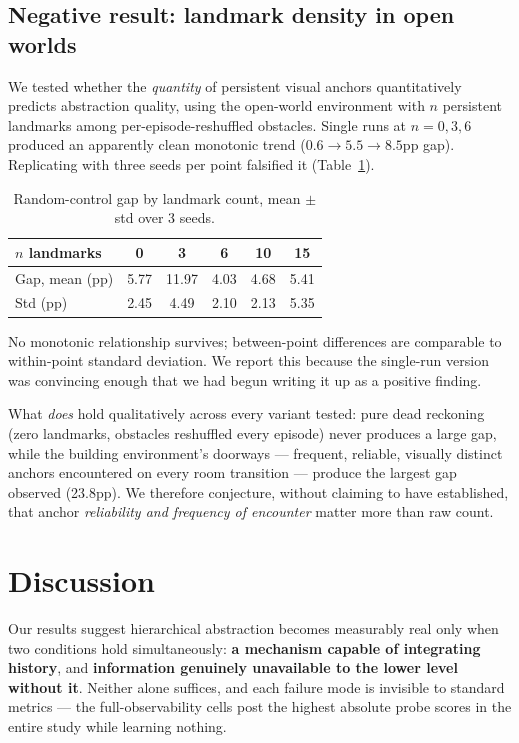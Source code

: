 \documentclass[11pt]{article}
\begin{document}
\subsection{Negative result: landmark density in open worlds}

We tested whether the \emph{quantity} of persistent visual anchors quantitatively predicts abstraction quality, using the open-world environment with $n$ persistent landmarks among per-episode-reshuffled obstacles. Single runs at $n=0,3,6$ produced an apparently clean monotonic trend ($0.6\to5.5\to8.5$pp gap). Replicating with three seeds per point falsified it (Table~\ref{tab:landmark}).

\begin{table}[h]
\centering
\caption{Random-control gap by landmark count, mean $\pm$ std over 3 seeds.}
\label{tab:landmark}
\begin{tabular}{lccccc}
\toprule
$n$ landmarks & 0 & 3 & 6 & 10 & 15 \\
\midrule
Gap, mean (pp) & 5.77 & 11.97 & 4.03 & 4.68 & 5.41 \\
Std (pp) & 2.45 & 4.49 & 2.10 & 2.13 & 5.35 \\
\bottomrule
\end{tabular}
\end{table}

No monotonic relationship survives; between-point differences are comparable to within-point standard deviation. We report this because the single-run version was convincing enough that we had begun writing it up as a positive finding.

What \emph{does} hold qualitatively across every variant tested: pure dead reckoning (zero landmarks, obstacles reshuffled every episode) never produces a large gap, while the building environment's doorways --- frequent, reliable, visually distinct anchors encountered on every room transition --- produce the largest gap observed (23.8pp). We therefore conjecture, without claiming to have established, that anchor \emph{reliability and frequency of encounter} matter more than raw count.

\section{Discussion}

Our results suggest hierarchical abstraction becomes measurably real only when two conditions hold simultaneously: \textbf{a mechanism capable of integrating history}, and \textbf{information genuinely unavailable to the lower level without it}. Neither alone suffices, and each failure mode is invisible to standard metrics --- the full-observability cells post the highest absolute probe scores in the entire study while learning nothing.
\end{document}
